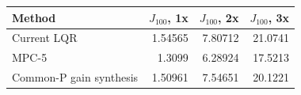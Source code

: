 \begin{tabular}{lrrr}
\toprule
Method & $J_{100}$, 1x & $J_{100}$, 2x & $J_{100}$, 3x \\
\midrule
Current LQR & 1.54565 & 7.80712 & 21.0741 \\
MPC-5 & 1.3099 & 6.28924 & 17.5213 \\
Common-P gain synthesis & 1.50961 & 7.54651 & 20.1221 \\
\bottomrule
\end{tabular}
